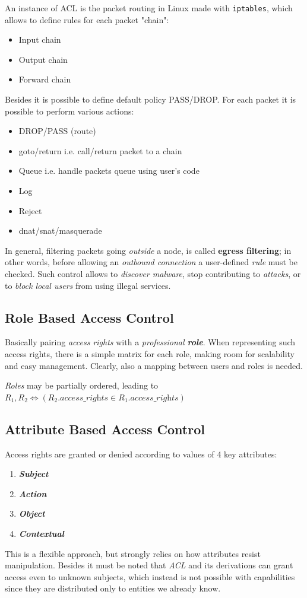 An instance of ACL is the packet routing in Linux made with \texttt{iptables},
which allows to define rules for each packet "chain":
\begin{itemize}
    \item Input chain
    \item Output chain
    \item Forward chain
\end{itemize}
Besides it is possible to define default policy PASS/DROP.
For each packet it is possible to perform various actions:
\begin{itemize}
    \item DROP/PASS (route)
    \item goto/return i.e. call/return packet to a chain
    \item Queue i.e. handle packets queue using user's code
    \item Log
    \item Reject
    \item dnat/snat/masquerade
\end{itemize} 

In general, filtering packets going \textit{outside} a node, is called \textbf{egress filtering};
in other words, before allowing an \textit{outbound connection} a user-defined \textit{rule} must be checked.
Such control allows to \textit{discover malware}, stop contributing to \textit{attacks}, or to \textit{block local users} from using illegal services.

\subsection{Role Based Access Control}
Basically pairing \textit{access rights} with a \textit{professional \textbf{role}}.
When representing such access rights, there is a simple matrix for each role, making room for scalability and easy management.
Clearly, also a mapping between users and roles is needed.

\textit{Roles} may be partially ordered, leading to $R_1,R_2 \Leftrightarrow (R_2.\textit{access\_rights} \in R_1.\textit{access\_rights})$

\subsection{Attribute Based Access Control}
Access rights are granted or denied according to values of 4 key attributes:
\begin{enumerate}
    \item \textit{\textbf{Subject}}
    \item \textit{\textbf{Action}}
    \item \textit{\textbf{Object}}
    \item \textit{\textbf{Contextual}}
\end{enumerate}

This is a flexible approach, but strongly relies on how attributes resist manipulation.
Besides it must be noted that \textit{ACL} and its derivations can grant access even to unknown subjects,
which instead is not possible with capabilities since they are distributed only to entities we already know.
